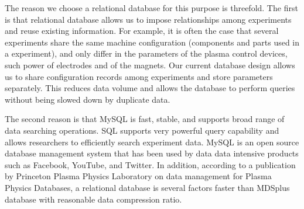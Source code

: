 The reason we choose a relational database for this purpose is threefold. The first is that relational database allows us to impose relationships among experiments and reuse existing information. For example, it is often the case that several experiments share the same machine configuration (components and parts used in a experiment), and only differ in the parameters of the plasma control devices, such power of electrodes and of the magnets. Our current database design allows us to share configuration records among experiments and store parameters separately. This reduces data volume and allows the database to perform queries without being slowed down by duplicate data.

The second reason is that MySQL is fast, stable, and supports broad range of data searching operations. SQL supports very powerful query capability and allows researchers to efficiently search experiment data. MySQL is an open source database management system that has been used by data data intensive products such as Facebook\cite{thusoo2010data}, YouTube\cite{jackson_youtube_mysql}, and Twitter\cite{winterford_twitter_mysql}. In addition, according to a publication by Princeton Plasma Physics Laboratory on data management for Plasma Physics Databases\cite{Davis2004183}, a relational database is several factors faster than MDSplus\cite{stillerman1997mdsplus} database with reasonable data compression ratio.





